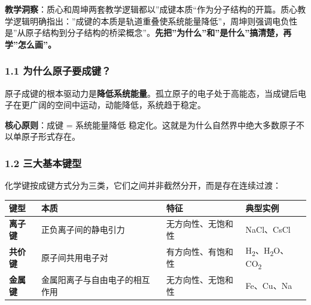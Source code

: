 \textbf{教学洞察}：质心和周坤两套教学逻辑都以''成键本质``作为分子结构的开篇。质心教学逻辑明确指出：''成键的本质是轨道重叠使系统能量降低''，周坤则强调电负性是''从原子结构到分子结构的桥梁概念''。\textbf{先把''为什么''和''是什么''搞清楚，再学''怎么画''。}

\subsubsection{1.1 为什么原子要成键？}\label{ux4e3aux4ec0ux4e48ux539fux5b50ux8981ux6210ux952e}

原子成键的根本驱动力是\textbf{降低系统能量}。孤立原子的电子处于高能态，当成键后电子在更广阔的空间中运动，动能降低，系统趋于稳定。

\textbf{核心原则}：成键 = 系统能量降低 \箭 稳定化。这就是为什么自然界中绝大多数原子不以单原子形式存在。

\subsubsection{1.2 三大基本键型}\label{ux4e09ux5927ux57faux672cux952eux578b}

化学键按成键方式分为三类，它们之间并非截然分开，而是存在连续过渡：

{\def\LTcaptype{none} %
\begin{longtable}[]{@{}
  >{\raggedright\arraybackslash}p{}
  >{\raggedright\arraybackslash}p{}
  >{\raggedright\arraybackslash}p{}
  >{\raggedright\arraybackslash}p{}@{}}
\toprule\noalign{}
\begin{minipage}[b]{\linewidth}\raggedright
键型
\end{minipage} & \begin{minipage}[b]{\linewidth}\raggedright
本质
\end{minipage} & \begin{minipage}[b]{\linewidth}\raggedright
特征
\end{minipage} & \begin{minipage}[b]{\linewidth}\raggedright
典型实例
\end{minipage} \\
\midrule\noalign{}
\endhead
\bottomrule\noalign{}
\endlastfoot
\textbf{离子键} & 正负离子间的静电引力 & 无方向性、无饱和性 & NaCl、CsCl \\
\textbf{共价键} & 原子间共用电子对 & 有方向性、有饱和性 & H\textsubscript{2}、H\textsubscript{2}O、CO\textsubscript{2} \\
\textbf{金属键} & 金属阳离子与自由电子的相互作用 & 无方向性、无饱和性 & Fe、Cu、Na \\
\end{longtable}
}

